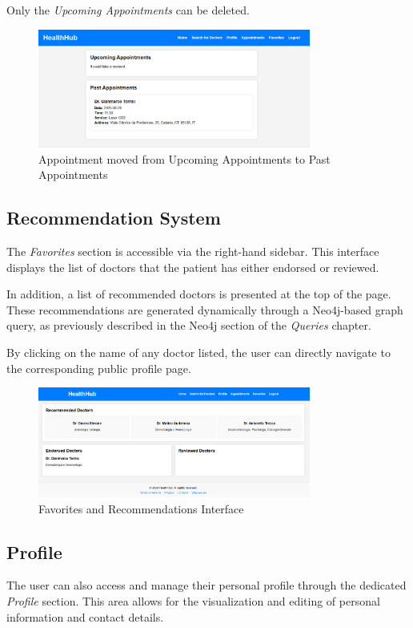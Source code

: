 Only the \textit{Upcoming Appointments} can be deleted. 

\begin{figure}[H]
	\centering
	\includegraphics[width=0.8\textwidth]{resources/screenshots/patient_ui/patient-old-appointment.png}
	\caption{Appointment moved from Upcoming Appointments to Past Appointments}
	\label{fig:patient-old-appointment}
\end{figure}

\subsection{Recommendation System}
The \textit{Favorites} section is accessible via the right-hand sidebar. This interface displays the list of doctors that the patient has either endorsed or reviewed.

In addition, a list of recommended doctors is presented at the top of the page. These recommendations are generated dynamically through a Neo4j-based graph query, as previously described in the Neo4j section of the \textit{Queries} chapter.

By clicking on the name of any doctor listed, the user can directly navigate to the corresponding public profile page.

\begin{figure}[H]
	\centering
	\includegraphics[width=0.8\textwidth]{resources/screenshots/patient_ui/favorites.png}
	\caption{Favorites and Recommendations Interface}
	\label{fig:favorites}
\end{figure}

\subsection{Profile}
The user can also access and manage their personal profile through the dedicated \textit{Profile} section. This area allows for the visualization and editing of personal information and contact details.

